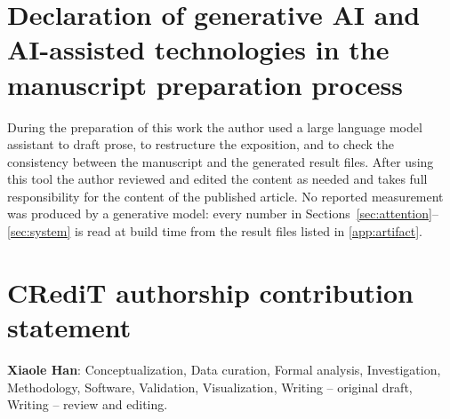 \documentclass[preprint,12pt,3p]{elsarticle}
\theoremstyle{definition}
\theoremstyle{remark}
\begin{document}
\section*{Declaration of generative AI and AI-assisted technologies in the
manuscript preparation process}
During the preparation of this work the author used a large language model
assistant to draft prose, to restructure the exposition, and to check the
consistency between the manuscript and the generated result files. After using
this tool the author reviewed and edited the content as needed and takes full
responsibility for the content of the published article. No reported
measurement was produced by a generative model: every number in
Sections~\ref{sec:attention}--\ref{sec:system} is read at build time from the
result files listed in \ref{app:artifact}.

\section*{CRediT authorship contribution statement}
\textbf{Xiaole Han}: Conceptualization, Data curation, Formal analysis,
Investigation, Methodology, Software, Validation, Visualization,
Writing -- original draft, Writing -- review and editing.



\end{document}
